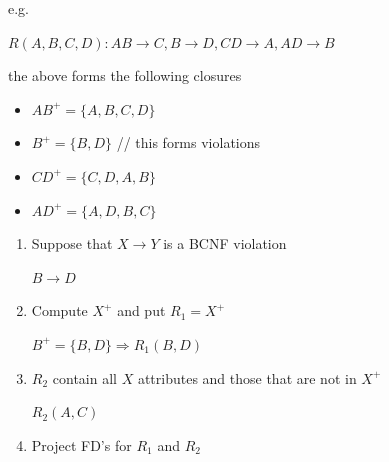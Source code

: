 \documentclass[12pt]{article}
\begin{document}
\begin{enumerate}[1.]
\begin{itemize}
\begin{itemize}
            \bigskip

            e.g.


            \bigskip

            $R(A,B,C,D): AB \to C, B \to D, CD \to A, AD \to B$

            \bigskip

            the above forms the following closures

            \bigskip

            \begin{itemize}
                \item $AB^+ = \{A, B, C, D\}$
                \item $B^+ = \{B, D\}$ // this forms violations
                \item $CD^+ = \{C, D, A, B\}$
                \item $AD^+ = \{A, D, B, C\}$
            \end{itemize}

            \bigskip

            \begin{enumerate}[1.]
                \item Suppose that $X \to Y$ is a BCNF violation

                \bigskip

                \color{red}
                $B \to D$
                \color{black}

                \bigskip

                \item Compute $X^+$ and put $R_1 = X^+$

                \bigskip

                \color{red}
                $B^+ = \{B,D\} \Rightarrow R_1(B,D)$
                \color{black}

                \bigskip

                \item $R_2$ contain all $X$ attributes and those that are not in $X^+$

                \bigskip

                \color{red}
                $R_2(A,C)$
                \color{black}

                \bigskip

                \item Project FD's for $R_1$ and $R_2$

                \bigskip



\end{enumerate}
\end{itemize}
\end{itemize}
\end{enumerate}
\end{document}
